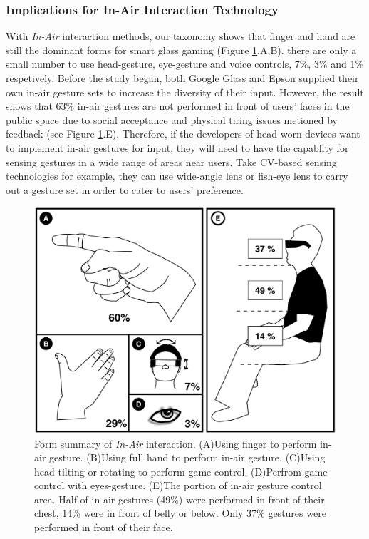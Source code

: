\documentclass{sigchi}
\begin{document}
    \subsubsection{Implications for In-Air Interaction Technology}
    With \emph{In-Air} interaction methods, our taxonomy shows that finger and hand are still the dominant  forms for smart glass gaming (Figure \ref{fig:figureInAirPorpotion}.{A,B}). there are only a small number to use head-gesture, eye-gesture and voice controls, 7\%, 3\% and 1\% respetively.
    Before the study began, both Google Glass and Epson\cite{GoogleGlass, Colaco:2013:MCL:2501988.2502042} supplied their own in-air gesture sets to increase the diversity of their input. However, the result shows that 63\% in-air gestures are not performed in front of users' faces in the public space due to social acceptance and physical tiring issues metioned by feedback (see Figure \ref{fig:figureInAirPorpotion}.E). Therefore, if the developers of head-worn devices want to implement in-air gestures for input, they will need to have the capablity for sensing gestures in a wide range of areas near users. Take CV-based sensing technologies for example, they can use wide-angle lens or fish-eye lens to carry out a gesture set in order to cater to users' preference.   
  \begin{figure}[!h]
  \centering
  \includegraphics[width=1\columnwidth]{InAirControlArea.pdf}
  \caption{Form summary of \emph{In-Air} interaction. (A)Using finger to perform in-air gesture. (B)Using full hand to perform in-air gesture. (C)Using head-tilting or rotating to perform game control. (D)Perfrom game control with eyes-gesture. (E)The portion of in-air gesture control area. Half of in-air gestures (49\%) were performed in front of their chest, 14\% were in front of belly or below. Only 37\% gestures were performed in front of their face.}
  \label{fig:figureInAirPorpotion}
  \end{figure}
\end{document}
